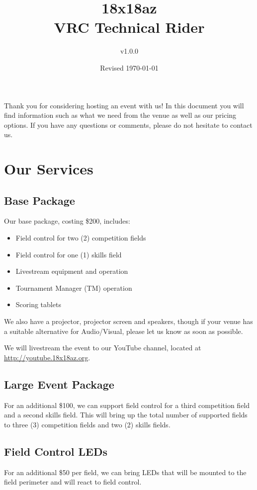 \documentclass[12pt]{article}
\title{18x18az\\VRC Technical Rider}
\author{v1.0.0}
\date{Revised \today}
\begin{document}
\maketitle
Thank you for considering hosting an event with us!
In this document you will find information such as what we need from the venue as well as our pricing options.
If you have any questions or comments, please do not hesitate to contact us.
\tableofcontents
\pagebreak
\section{Our Services}
\subsection{Base Package}
Our base package, costing \$200, includes:
\begin{itemize}
    \item Field control for two (2) competition fields
    \item Field control for one (1) skills field
    \item Livestream equipment and operation
    \item Tournament Manager (TM) operation
    \item Scoring tablets
\end{itemize}
We also have a projector, projector screen and speakers, though if your venue has a suitable alternative for Audio/Visual, please let us know as soon as possible.
\vspace{1em}

\noindent We will livestream the event to our YouTube channel, located at \\\url{http://youtube.18x18az.org}.

\subsection{Large Event Package}
For an additional \$100, we can support field control for a third competition field and a second skills field.
This will bring up the total number of supported fields to three (3) competition fields and two (2) skills fields.

\subsection{Field Control LEDs}
For an additional \$50 per field, we can bring LEDs that will be mounted to the field perimeter and will react to field control.
\end{document}
